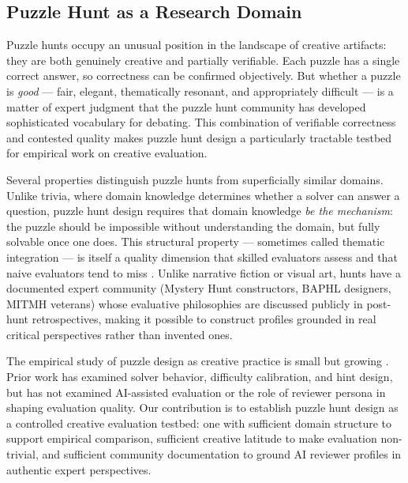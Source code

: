 \subsection{Puzzle Hunt as a Research Domain}

Puzzle hunts occupy an unusual position in the landscape of creative artifacts: they are both genuinely creative and partially verifiable. Each puzzle has a single correct answer, so correctness can be confirmed objectively. But whether a puzzle is \emph{good} --- fair, elegant, thematically resonant, and appropriately difficult --- is a matter of expert judgment that the puzzle hunt community has developed sophisticated vocabulary for debating. This combination of verifiable correctness and contested quality makes puzzle hunt design a particularly tractable testbed for empirical work on creative evaluation.

Several properties distinguish puzzle hunts from superficially similar domains. Unlike trivia, where domain knowledge determines whether a solver can answer a question, puzzle hunt design requires that domain knowledge \emph{be the mechanism}: the puzzle should be impossible without understanding the domain, but fully solvable once one does. This structural property --- sometimes called thematic integration --- is itself a quality dimension that skilled evaluators assess and that naive evaluators tend to miss \cite{williams2014puzzlehunt}. Unlike narrative fiction or visual art, hunts have a documented expert community (Mystery Hunt constructors, BAPHL designers, MITMH veterans) whose evaluative philosophies are discussed publicly in post-hunt retrospectives, making it possible to construct profiles grounded in real critical perspectives rather than invented ones.

The empirical study of puzzle design as creative practice is small but growing \cite{link2018puzzledesign, ormond2022huntcraft}. Prior work has examined solver behavior, difficulty calibration, and hint design, but has not examined AI-assisted evaluation or the role of reviewer persona in shaping evaluation quality. Our contribution is to establish puzzle hunt design as a controlled creative evaluation testbed: one with sufficient domain structure to support empirical comparison, sufficient creative latitude to make evaluation non-trivial, and sufficient community documentation to ground AI reviewer profiles in authentic expert perspectives.
